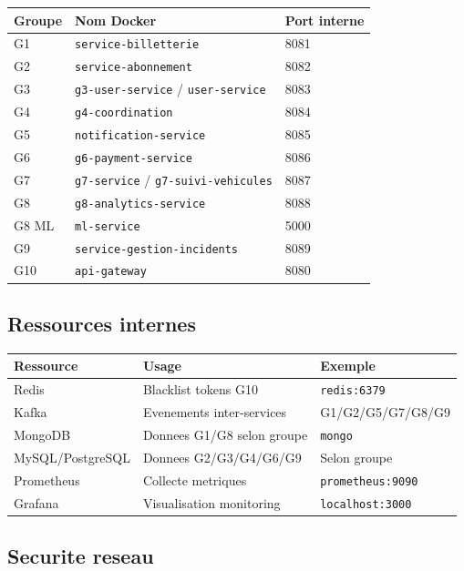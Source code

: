 \documentclass[12pt,a4paper]{article}
\begin{document}
\begin{longtable}{p{4cm}p{5cm}p{4cm}}
\toprule
\textbf{Groupe} & \textbf{Nom Docker} & \textbf{Port interne} \\
\midrule
G1 & \texttt{service-billetterie} & 8081 \\
G2 & \texttt{service-abonnement} & 8082 \\
G3 & \texttt{g3-user-service} / \texttt{user-service} & 8083 \\
G4 & \texttt{g4-coordination} & 8084 \\
G5 & \texttt{notification-service} & 8085 \\
G6 & \texttt{g6-payment-service} & 8086 \\
G7 & \texttt{g7-service} / \texttt{g7-suivi-vehicules} & 8087 \\
G8 & \texttt{g8-analytics-service} & 8088 \\
G8 ML & \texttt{ml-service} & 5000 \\
G9 & \texttt{service-gestion-incidents} & 8089 \\
G10 & \texttt{api-gateway} & 8080 \\
\bottomrule
\end{longtable}

\subsection{Ressources internes}

\begin{longtable}{p{4cm}p{5cm}p{5cm}}
\toprule
\textbf{Ressource} & \textbf{Usage} & \textbf{Exemple} \\
\midrule
Redis & Blacklist tokens G10 & \texttt{redis:6379} \\
Kafka & Evenements inter-services & G1/G2/G5/G7/G8/G9 \\
MongoDB & Donnees G1/G8 selon groupe & \texttt{mongo} \\
MySQL/PostgreSQL & Donnees G2/G3/G4/G6/G9 & Selon groupe \\
Prometheus & Collecte metriques & \texttt{prometheus:9090} \\
Grafana & Visualisation monitoring & \texttt{localhost:3000} \\
\bottomrule
\end{longtable}

\subsection{Securite reseau}
\end{document}
